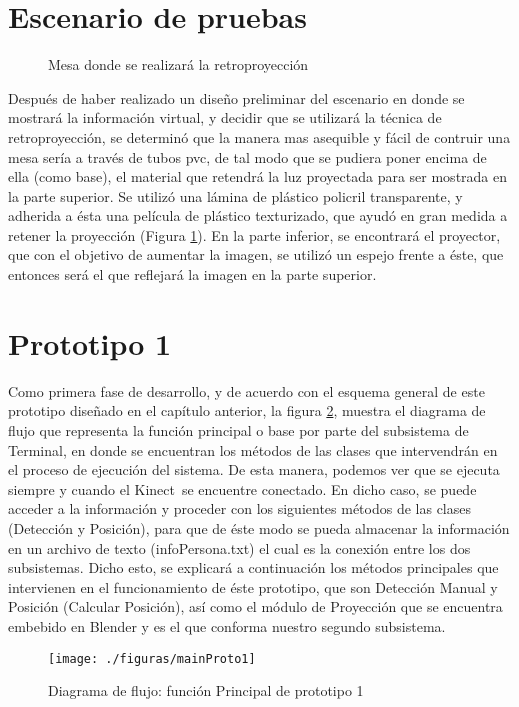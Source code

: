 \documentclass[a4paper,openright,12pt]{report}
\begin{document}
\section{Escenario de pruebas}
\begin{figure}[ht]
	\centering
	\hspace{-2mm}
	\hspace*{10mm}
	\caption{Mesa donde se realizará la retroproyección} \label{fig:mesa}
\end{figure}
Después de haber realizado un diseño preliminar del escenario en donde se mostrará la información virtual, y decidir que se utilizará la técnica de retroproyección, se determinó que la manera mas asequible y fácil de contruir una mesa sería a través de tubos pvc, de tal modo que se pudiera poner encima de ella (como base), el material que retendrá la luz proyectada para ser mostrada en la parte superior. Se utilizó una lámina de plástico policril transparente, y adherida a ésta una película de plástico texturizado, que ayudó en gran medida a retener la proyección (Figura \ref{fig:mesa}). En la parte inferior, se encontrará el proyector, que con el objetivo de aumentar la imagen, se utilizó un espejo frente a éste, que entonces será el que reflejará la imagen en la parte superior.


\section{Prototipo 1}
Como primera fase de desarrollo, y de acuerdo con el esquema general de este prototipo diseñado en el capítulo anterior, la figura \ref{fig:mainProto1}, muestra el diagrama de flujo que representa la función principal o base por parte del subsistema de Terminal, en donde se encuentran los métodos de las clases que intervendrán en el proceso de ejecución del sistema. De esta manera, podemos ver que se ejecuta siempre y cuando el Kinect\textcopyright\ se encuentre conectado. En dicho caso, se puede acceder a la información y proceder con los siguientes métodos de las clases (Detección y Posición), para que de éste modo se pueda almacenar la información en un archivo de texto (infoPersona.txt) el cual es la conexión entre los dos subsistemas. Dicho esto, se explicará a continuación los métodos principales que intervienen en el funcionamiento de éste prototipo, que son Detección Manual y Posición (Calcular Posición), así como el módulo de Proyección que se encuentra embebido en Blender y es el que conforma nuestro segundo subsistema.
\begin{figure}[ht]
	\centering
	\texttt{[image: ./figuras/mainProto1]}
	\caption{Diagrama de flujo: función Principal de prototipo 1} \label{fig:mainProto1}
\end{figure}
\end{document}
